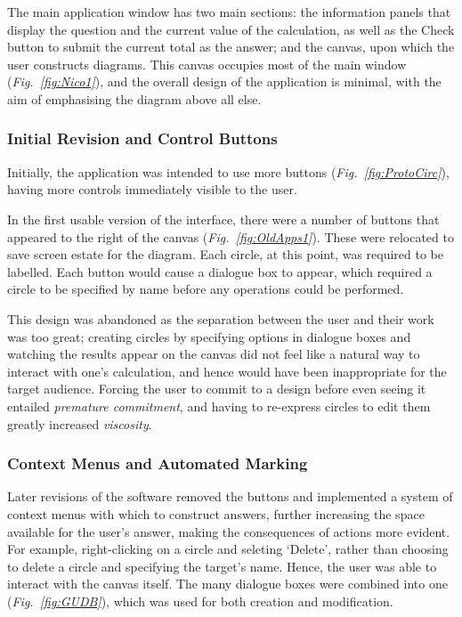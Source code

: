 \documentclass[12pt,twoside,notitlepage,xetex]{report}
\begin{document}
The main application window has two main sections: the information panels that display the question and the current value of the calculation, as well as the {\sfapp Check} button to submit the current total as the answer; and the canvas, upon which the user constructs diagrams.  This canvas occupies most of the main window (\emph{Fig.~\ref{fig:Nico1}}), and the overall design of the application is minimal, with the aim of emphasising the diagram above all else.

\subsubsection{Initial Revision and Control Buttons}

Initially, the application was intended to use more buttons (\emph{Fig.~\ref{fig:ProtoCirc}}), having more controls immediately visible to the user.

In the first usable version of the interface, there were a number of buttons that appeared to the right of the canvas (\emph{Fig.~\ref{fig:OldApps1}}).  These were relocated to save screen estate for the diagram.  Each circle, at this point, was required to be labelled.  Each button would cause a dialogue box to appear, which required a circle to be specified by name before any operations could be performed.

This design was abandoned as the separation between the user and their work was too great; creating circles by specifying options in dialogue boxes and watching the results appear on the canvas did not feel like a natural way to interact with one's calculation, and hence would have been inappropriate for the target audience.  Forcing the user to commit to a design before even seeing it entailed \emph{premature commitment}, and having to re-express circles to edit them greatly increased \emph{viscosity}.

\subsubsection{Context Menus and Automated Marking}

Later revisions of the software removed the buttons and implemented a system of context menus with which to construct answers, further increasing the space available for the user's answer, making the consequences of actions more evident.  For example, right-clicking on a circle and seleting `Delete', rather than choosing to delete a circle and specifying the target's name.  Hence, the user was able to interact with the canvas itself.  The many dialogue boxes were combined into one (\emph{Fig.~\ref{fig:GUDB}}), which was used for both creation and modification.
\end{document}
